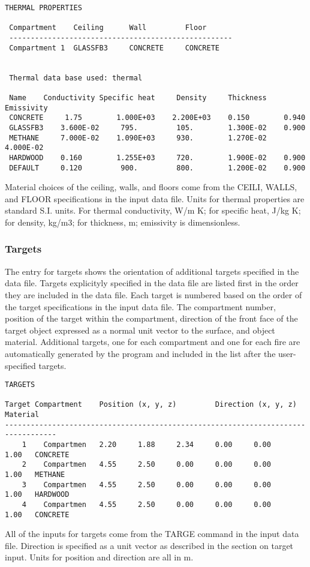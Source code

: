 \begin{lstlisting}[basicstyle=\scriptsize]
 THERMAL PROPERTIES

 Compartment    Ceiling      Wall         Floor
 ----------------------------------------------------
 Compartment 1  GLASSFB3     CONCRETE     CONCRETE


 Thermal data base used: thermal

 Name    Conductivity Specific heat     Density     Thickness   Emissivity
 CONCRETE     1.75        1.000E+03    2.200E+03    0.150        0.940
 GLASSFB3    3.600E-02     795.         105.        1.300E-02    0.900
 METHANE     7.000E-02    1.090E+03     930.        1.270E-02    4.000E-02
 HARDWOOD    0.160        1.255E+03     720.        1.900E-02    0.900
 DEFAULT     0.120         900.         800.        1.200E-02    0.900
\end{lstlisting}
Material choices of the ceiling, walls, and floors come from the CEILI, WALLS, and FLOOR specifications in the input data file. Units for thermal properties are standard S.I. units.  For thermal conductivity, W/m K; for specific heat, J/kg K; for density, kg/m3; for thickness, m; emissivity is dimensionless.


\subsubsection{Targets}

The entry for targets shows the orientation of additional targets specified in the data file. Targets explicityly specified in the data file are listed first in the order they are included in the data file.  Each target is numbered based on the order of the target specifications in the input data file.  The compartment number, position of the target within the compartment, direction of the front face of the target object expressed as a normal unit vector to the surface, and object material. Additional targets, one for each compartment and one for each fire are automatically generated by the program and included in the list after the user-specified targets.

\begin{lstlisting}[basicstyle=\scriptsize]
TARGETS

Target Compartment    Position (x, y, z)         Direction (x, y, z)      Material
----------------------------------------------------------------------------------
    1    Compartmen   2.20     1.88     2.34     0.00     0.00     1.00   CONCRETE
    2    Compartmen   4.55     2.50     0.00     0.00     0.00     1.00   METHANE
    3    Compartmen   4.55     2.50     0.00     0.00     0.00     1.00   HARDWOOD
    4    Compartmen   4.55     2.50     0.00     0.00     0.00     1.00   CONCRETE
\end{lstlisting}
All of the inputs for targets come from the TARGE command in the input data file. Direction is specified as a unit vector as described in the section on target input. Units for position and direction are all in m.


